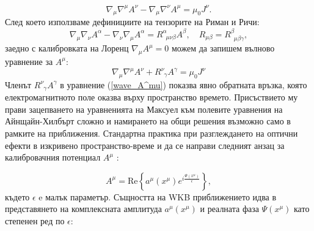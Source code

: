\begin{equation}
	\nabla_\mu \nabla^\mu A^\nu - \nabla_\mu \nabla^\nu A^\mu = \mu_0 J^\nu.
\end{equation}
След което използваме дефинициите на тензорите на Риман и Ричи:
\begin{equation}
	\nabla_\mu \nabla_\nu A^\alpha - \nabla_\nu \nabla_\mu A^\alpha = R^\alpha_{\,\,\,\mu\nu\beta} A^\beta, \quad R_{\mu\beta} = R^\beta_{\,\,\,\mu\beta\gamma},
\end{equation} 
заедно с калибровката на Лоренц $\nabla_{\mu} A^\mu = 0$ можем да запишем вълново уравнение за $A^\mu$:
\begin{equation}\label{wave_A^mu}
	\nabla_{\mu}\nabla^\mu A^\nu + R^\nu_{\,\,\,\gamma} A^\gamma = \mu_0 J^\nu
\end{equation}
Членът $R^\nu_{\,\,\,\gamma} A^\gamma$ в уравнение (\ref{wave_A^mu}) показва явно обратната връзка, която електромагнитното поле оказва върху пространство времето. Присъствието му прави зацепването на уравненията на Максуел към полевите уравнения на Айнщайн-Хилбърт сложно и намирането на общи решения възможно само в рамките на приближения. Стандартна практика при разглеждането на оптични ефекти в изкривено пространство-време и да се направи следният анзац за калибровачния потенциал $A^\mu$ \cite{Oancea2020}\cite{Misner1973}:

\begin{equation}\label{A^mu_anzatz}
	A^\mu = \text{Re}\left\{a^\mu(x^\mu)e^{i\frac{\Psi(x^\mu)}{\epsilon}}\right\},
\end{equation}
където $\epsilon$ e малък параметър. Същността на WKB приближението идва в представянето на комплексната амплитуда $a^\mu(x^\mu)$ и реалната фаза $\Psi(x^\mu)$ като степенен ред по $\epsilon$:

